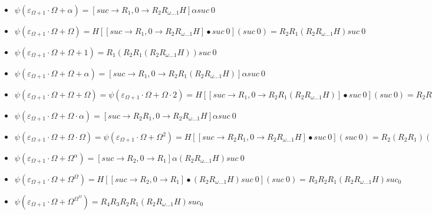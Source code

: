 \documentclass[10pt]{article}
\begin{document}
\begin{itemize}
\item \( \psi(\varepsilon_{\Omega+1} \cdot \Omega+\alpha) = [suc \rightarrow R_1, 0 \rightarrow R_2 R_{\omega \ldots 1} H] \alpha suc\ 0 \)

\item \( \psi(\varepsilon_{\Omega+1} \cdot \Omega+\Omega) = H [[suc \rightarrow R_1, 0 \rightarrow R_2 R_{\omega \ldots 1} H] \bullet suc\ 0] (suc\ 0) = R_2 R_1 (R_2 R_{\omega \ldots 1} H) suc\ 0 \)

\item \( \psi(\varepsilon_{\Omega+1} \cdot \Omega+\Omega+1) = R_1 (R_2 R_1 (R_2 R_{\omega \ldots 1} H)) suc\ 0 \)

\item \( \psi(\varepsilon_{\Omega+1} \cdot \Omega+\Omega+\alpha) = [suc \rightarrow R_1, 0 \rightarrow R_2 R_1 (R_2 R_{\omega \ldots 1} H)] \alpha suc\ 0 \)

\item \( \psi(\varepsilon_{\Omega+1} \cdot \Omega+\Omega+\Omega) = \psi(\varepsilon_{\Omega+1} \cdot \Omega+\Omega \cdot 2) = H [[suc \rightarrow R_1, 0 \rightarrow R_2 R_1 (R_2 R_{\omega \ldots 1} H)] \bullet suc\ 0] (suc\ 0) = R_2 R_1 (R_2 R_1 (R_2 R_{\omega \ldots 1} H)) suc\ 0 \)

\item \( \psi(\varepsilon_{\Omega+1} \cdot \Omega+\Omega \cdot \alpha) = [suc \rightarrow R_2 R_1, 0 \rightarrow R_2 R_{\omega \ldots 1} H] \alpha suc\ 0 \)

\item \( \psi(\varepsilon_{\Omega+1} \cdot \Omega+\Omega \cdot \Omega) = \psi(\varepsilon_{\Omega+1} \cdot \Omega+\Omega^2) = H [[suc \rightarrow R_2 R_1, 0 \rightarrow R_2 R_{\omega \ldots 1} H] \bullet suc\ 0] (suc\ 0) = R_2 (R_2 R_1) (R_2 R_{\omega \ldots 1} H) suc\ 0 \)

\item \( \psi(\varepsilon_{\Omega+1} \cdot \Omega+\Omega^\alpha) = [suc \rightarrow R_2, 0 \rightarrow R_1] \alpha (R_2 R_{\omega \ldots 1} H) suc\ 0 \)

\item \( \psi(\varepsilon_{\Omega+1} \cdot \Omega+\Omega^\Omega) = H [[suc \rightarrow R_2, 0 \rightarrow R_1] \bullet (R_2 R_{\omega \ldots 1} H) suc\ 0] (suc\ 0) = R_3 R_2 R_1 (R_2 R_{\omega \ldots 1} H) suc_ 0 \)

\item \( \psi(\varepsilon_{\Omega+1} \cdot \Omega+\Omega^{\Omega^\Omega}) = R_4 R_3 R_2 R_1 (R_2 R_{\omega \ldots 1} H) suc_ 0 \)


\end{itemize}
\end{document}
